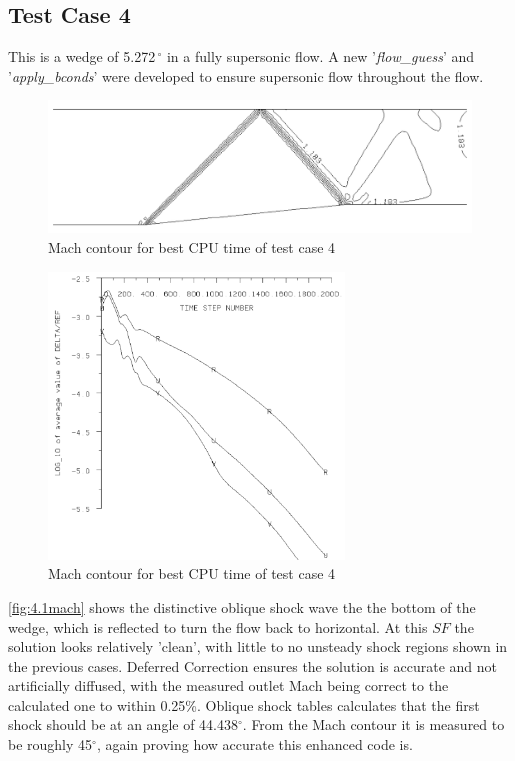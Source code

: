 \documentclass[12pt, a4paper]{article}
\begin{document}
\subsection{Test Case 4}
This is a wedge of 5.272$\,^{\circ}$ in a fully supersonic flow. A new '\textit{flow\_guess}' and '\textit{apply\_bconds}' were developed to ensure supersonic flow throughout the flow. 
\begin{figure}[H]
	\centering
	\includegraphics[width=\textwidth]{plots/4.1 mach}
	\caption{Mach contour for  best CPU time of test case 4}
	\label{fig:4.1mach}
\end{figure}
\begin{figure}[H]
	\centering
	\includegraphics[width=0.7\textwidth]{plots/4.1 conv}
	\caption{Mach contour for  best CPU time of test case 4}
	\label{fig:4.1conv}
\end{figure}
\autoref{fig:4.1mach} shows the distinctive oblique shock wave the the bottom of the wedge, which is reflected to turn the flow back to horizontal. At this $SF$ the solution looks relatively 'clean', with little to no unsteady shock regions shown in the previous cases. Deferred Correction ensures the solution is accurate and not artificially diffused, with the measured outlet Mach being correct to the calculated one to within 0.25\%. Oblique shock tables calculates that the first shock should be at an angle of  44.438$^{\circ}$. From the Mach contour it is measured to be roughly 45$^{\circ}$, again proving how accurate this enhanced code is.
\end{document}

